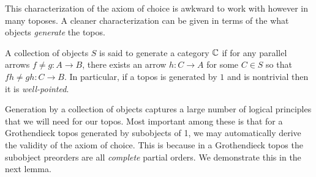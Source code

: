 This characterization of the axiom of choice is awkward to work with
however in many toposes. A cleaner characterization can be given in
terms of the what objects \emph{generate} the topos.

\begin{defn}\label{defn:background:generate}
  A collection of objects $S$ is said to generate a category $\mathbb{C}$
  if for any parallel arrows $f \neq g : A \to B$, there exists an
  arrow $h : C \to A$ for some $C \in S$ so that
  $fh \neq gh : C \to B$. In particular, if a topos is generated by
  $1$ and is nontrivial then it is \emph{well-pointed}.
\end{defn}

Generation by a collection of objects captures a large number of
logical principles that we will need for our topos. Most important
among these is that for a Grothendieck topos generated by subobjects
of 1, we may automatically derive the validity of the axiom of
choice. This is because in a Grothendieck topos the subobject
preorders are all \emph{complete} partial orders. We demonstrate this
in the next lemma.

